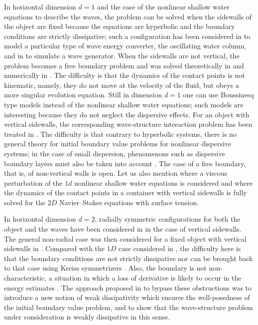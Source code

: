 In horizontal dimension $d=1$ and the case of the nonlinear shallow water equations to describe the waves,
the problem can be solved when the sidewalls of the object are fixed because the equations are hyperbolic and the boundary conditions are strictly dissipative;
such a configuration has been considered in \cite{BocchiHeVergara} to model a particular type of wave energy converter, the oscillating water column,
and in \cite{SuTucsnak} to simulate a wave generator.
When the sidewalls are not vertical,
the problem becomes a free boundary problem and was solved theoretically in \cite{IguchiLannes2021} and numerically in \cite{HaidarMarcheVilar}.
The difficulty is that the dynamics of the contact points is not kinematic, namely, they do not move at the velocity of the fluid,
but obeys a more singular evolution equation.
Still in dimension $d=1$ one can use Boussinesq type models instead of the nonlinear shallow water equations;
such models are interesting because they do not neglect the dispersive effects.
For an object with vertical sidewalls,
the corresponding wave-structure interaction problem has been treated in \cite{BreschLannesMetivier,BeckLannes,BeckLannesWeynans}.
The difficulty is that contrary to hyperbolic systems, there is no general theory for initial boundary value problems for nonlinear dispersive systems;
in the case of small dispersion, phenomenons such as dispersive boundary layers must also be taken into account \cite{BreschLannesMetivier}.
The case of a free boundary, that is, of non-vertical walls is open.
Let us also mention \cite{MSTT} where a viscous perturbation of the $1d$ nonlinear shallow water equations is considered and \cite{GuoTice,GuoTiceZheng}
where the dynamics of the contact points in a container with vertical sidewalls is fully solved for the $2D$ Navier--Stokes equations with surface tension.

In horizontal dimension $d=2$, radially symmetric configurations for both the object and the waves have been considered in \cite{Bocchi1,Bocchi2}
in the case of vertical sidewalls.
The general non-radial case was then considered for a fixed object with vertical sidewalls in \cite{IguchiLannes2023}.
Compared with the $1D$ case considered in \cite{IguchiLannes2021}, the difficulty here is that
the boundary conditions are not strictly dissipative nor can be brought back to that case using Kreiss symmetrizers \cite{Majda,Metivier,BenzoniSerre,Audiard}.
Also, the boundary is not non-characteristic,
a situation in which a loss of derivative is likely to occur in the energy estimates \cite{Gues,Secchi,MajdaOsher,CoulombelSecchi}.
The approach proposed in \cite{IguchiLannes2023} to bypass these obstructions was to introduce a new notion of weak dissipativity
which ensures the well-posedness of the initial boundary value problem,
and to show that the wave-structure problem under consideration is weakly dissipative in this sense.


